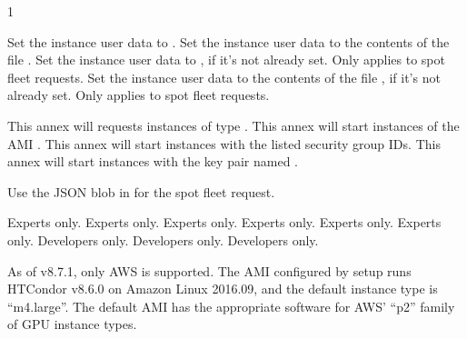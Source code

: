 \begin{ManPage}{\label{man-condor-annex}}{1}
\begin{Options}
		{Set the instance user data to .}
		{Set the instance user data to the contents of the file .}
		{Set the instance user data to , if it's not already set.  Only applies to spot fleet requests.}
		{Set the instance user data to the contents of the file , if it's not already set.  Only applies to spot fleet requests.}

		{This annex will requests instances of type .}
		{This annex will start instances of the AMI .}
		{This annex will start instances with the listed security group IDs.}
		{This annex will start instances with the key pair named .}

		{Use the JSON blob in  for the spot fleet request.}

	 {Experts only.}
	 {Experts only.}
	 {Experts only.}
	 {Experts only.}
	 {Experts only.}
	 {Experts only.}
	 {Developers only.}
	 {Developers only.}
	 {Developers only.}
\end{Options}

\GenRem

As of v8.7.1, only AWS is supported.  The AMI configured by setup runs
HTCondor v8.6.0 on Amazon Linux 2016.09, and the default instance type
is ``m4.large''.  The default AMI has the appropriate software for AWS'
``p2'' family of GPU instance types.


\end{ManPage}
